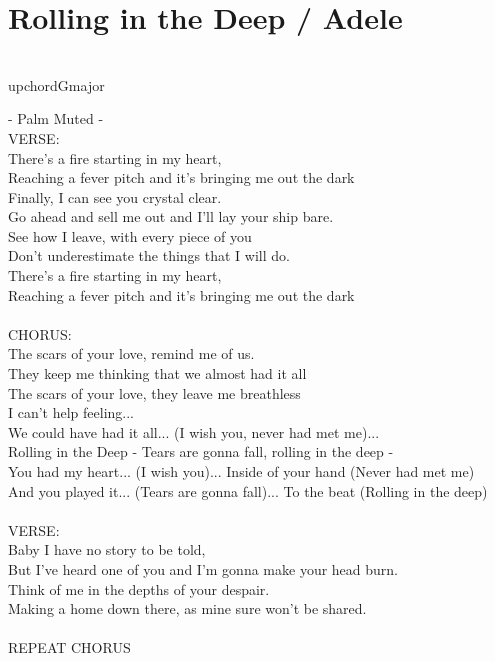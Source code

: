 \section{Rolling in the Deep / Adele}\label{sec:rollinginthedeep}

\\upchord{Gm}ajor
\AminorSeven
\BminorSeven


 - Palm Muted -\\

VERSE:          \\              
There's a fire starting in my heart,      \\                                          
 Reaching a fever pitch and it's bringing me out the dark\\
Finally, I can see you crystal clear.\\
Go ahead and sell me out and I'll lay your ship bare.\\
See how I leave, with every piece of you\\
Don't underestimate the things that I will do.\\
There's a fire starting in my heart,\\
Reaching a fever pitch and it's bringing me out the dark\\
\\
CHORUS:           \\
The scars of your love, remind me of us.        \\           
They keep me thinking that we almost had it all\\
The scars of your love, they leave me breathless\\
I can't help feeling...\\
We could have had it all... (I wish you, never had met me)...\\
Rolling in the Deep - Tears are gonna fall, rolling in the deep -\\
You had my heart... (I wish you)... Inside of your hand (Never had met me)\\
And you played it... (Tears are gonna fall)... To the beat (Rolling in the deep)\\
\\
VERSE:     \\
Baby I have no story to be told,\\
But I've heard one of you and I'm gonna make your head burn.\\
Think of me in the depths of your despair.\\
Making a home down there, as mine sure won't be shared.\\
                        \\
REPEAT CHORUS\\
